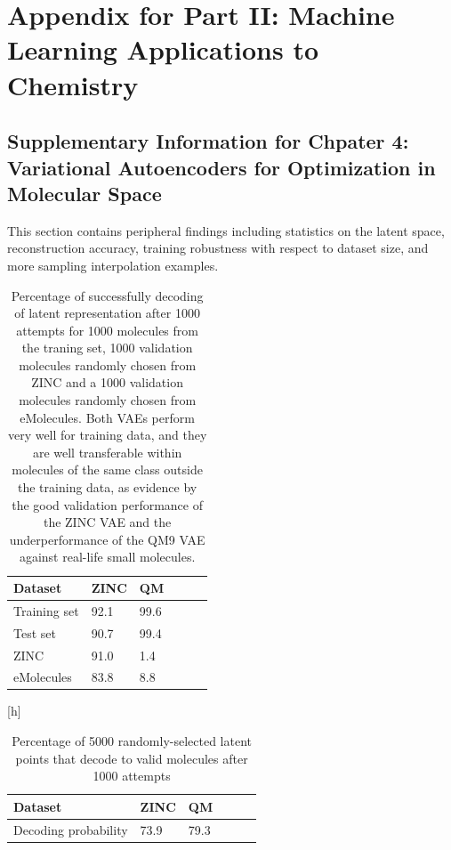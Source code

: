 \chapter{Appendix for Part II: Machine Learning Applications to Chemistry}
\renewcommand\thefigure{\thesection.\arabic{figure}}
\renewcommand\thetable{\thesection.\arabic{table}}


\section{Supplementary Information for Chpater 4: Variational Autoencoders for Optimization in Molecular Space}

This section contains peripheral findings including statistics on the latent space, reconstruction accuracy, training robustness with respect to dataset size, and more sampling interpolation examples.

\begin{table}[h]
\centering
\caption{Percentage of successfully decoding of latent representation after 1000 attempts for 1000 molecules from the traning set, 1000 validation molecules randomly chosen from ZINC and a 1000 validation molecules randomly chosen from eMolecules. Both VAEs perform very well for training data, and they are well transferable within molecules of the same class outside the training data, as evidence by the good validation performance of the ZINC VAE and the underperformance of the QM9 VAE against real-life small molecules.}
\begin{tabular}{lp{1cm}lp{1cm}lp{1cm}}
\hline
Dataset & ZINC & QM \\
\hline
Training set & 92.1 & 99.6 \\
Test set & 90.7 & 99.4 \\
ZINC & 91.0 & 1.4 \\
eMolecules & 83.8 & 8.8 \\
\hline
\end{tabular}
\label{tab:recovery statistics}
\end{table}[h]

\begin{table}[h]
\centering
\caption{Percentage of 5000 randomly-selected latent points that decode to valid molecules after 1000 attempts}
\begin{tabular}{lp{1cm}lp{1cm}lp{1cm}}
Dataset & ZINC & QM \\
\hline
Decoding probability & 73.9 & 79.3 \\
\end{tabular}
\label{tab:random_sampling_statistics}
\end{table}


